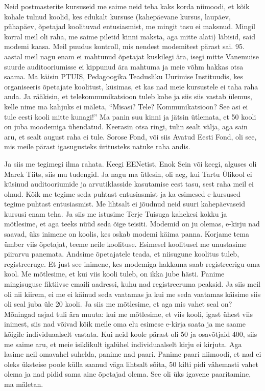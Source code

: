 Neid postmasterite kursuseid me saime neid teha kaks korda niimoodi, et kõik 
kohale tulnud koolid, kes edukalt kursuse (kahepäevane kursus, laupäev, 
pühapäev, õpetajad koolituvad entusiasmist, me mingit tasu ei maksnud. Mingil 
korral meil oli raha, me saime piletid kinni maksta, aga mitte alati) läbisid, 
said modemi kaasa. Meil puudus kontroll, mis nendest modemitest pärast sai. 95. 
aastal meil nagu enam ei mahtunud õpetajat kuskilegi ära, isegi mitte Vanemuise 
suurde auditooriumisse ei kippunud ära mahtuma ja meie võhm hakkas otsa 
saama. Ma käisin PTUIS, Pedagoogika Teadusliku Uurimise Instituudis, kes 
organiseeris õpetajate koolitust, küsimas, et kas nad meie kursustele ei taha 
raha anda. Ja rääkisin, et telekommunikatsioon tuleb kohe ja siis siis vastab 
ülemus, kelle nime ma kahjuks ei mäleta, \enquote{Misasi? Tele? 
Kommunikatsioon? See asi ei tule eesti kooli mitte kunagi!} Ma panin suu kinni 
ja jätsin ütlemata, et  50 kooli on juba moodemiga ühendatud. Keerasin otsa 
ringi, tulin sealt välja, aga sain aru, et sealt august raha ei tule. Sorose 
Fond, või siis Avatud Eesti Fond, 
oli see, mis meile pärast igasugusteks üritusteks natuke raha andis. 

Ja siis me tegimegi ilma rahata. Keegi EENetist, Enok Sein või keegi, alguses oli Marek Tiits, siis mu 
tudengid. Ja nagu ma ütlesin, oli aeg, kui Tartu Ülikool ei küsinud 
auditooriumide ja arvutiklasside kasutamise eest tasu, sest raha meil ei olnud. 
Kõik me tegime seda puhtast entusiasmist ja ka esimesed e-kursused tegime 
puhtast entusiasmist. Me lihtsalt ei jõudnud neid suuri kahepäevaseid kursusi 
enam teha. Ja siis me istusime Terje Tuisuga kahekesi 
kokku ja mõtlesime, et aga teeks nüüd seda õige teisiti. Modemid on ju olemas, 
e-kirju nad saavad, üks inimene on koolis, kes oskab modemi käima panna. 
Korjame tema ümber viis õpetajat, teeme neile koolituse. Esimesel koolitusel me 
unustasime piirarvu panemata. Andsime õpetajatele teada, et niisugune koolitus 
tuleb, registreeruge. Et just see inimene, kes modemiga hakkama saab 
registreerigu oma kool. Me mõtlesime, et kui viis kooli tuleb, on ikka jube 
hästi. Panime mingisuguse fiktiivse emaili aadressi, kuhu nad registreeruma 
peaksid. Ja siis meil oli nii kiirem, ei me ei käinud seda vaatamas ja kui me 
seda vaatamas käisime siis oli seal juba üle 20 kooli. Ja siis me mõtlesime, et 
aga mis vahet seal on? Mõningad asjad tuli ära muuta: kui me mõtlesime, et viis 
kooli, igast ühest viis inimest, siis nad võivad kõik meile oma elu esimese 
e-kirja saata ja me saame kõigile individuaalselt vastata. Kui neid koole 
pärast oli 50 ja osavõtjaid 400, siis me saime aru, et meie isiklikult igalühel 
individuaalselt kirju ei kirjuta. Aga  lasime neil omavahel suhelda, panime nad 
paari. Panime paari niimoodi, et nad ei oleks üksteise poole külla saanud väga 
lihtsalt sõita, 50 kilti pidi vähemasti vahet olema ja nad pidid sama aine 
õpetajad olema. See oli üks igavene paaritamine, ma mäletan.  


